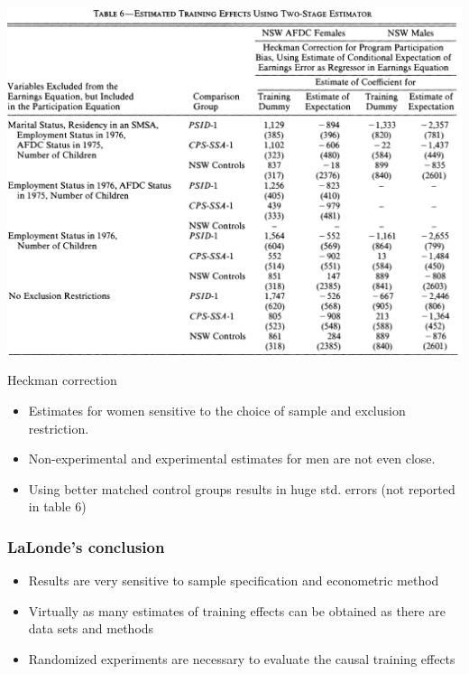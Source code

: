 \documentclass[notes=show,beamer,compress]{beamer}
\begin{document}
\begin{frame}{}
\includegraphics[width=1.0\linewidth]{graphs/lalonde86_6.png}

\end{frame}

\begin{frame}{Heckman correction}
\begin{itemize}
	\item Estimates for women sensitive to the choice of sample and exclusion restriction.
	\item Non-experimental and experimental estimates for men are not even close.
	\item Using better matched control groups results in huge std. errors (not reported in table 6)
\end{itemize}
\end{frame}

\begin{frame}
\frametitle{LaLonde's conclusion}

\begin {itemize}
\item Results are very sensitive to sample specification and econometric method
\item Virtually as many estimates of training effects can be obtained as there are data sets and methods
\item Randomized experiments are necessary to evaluate the causal training effects
\end{itemize}

\end{frame}
\end{document}

